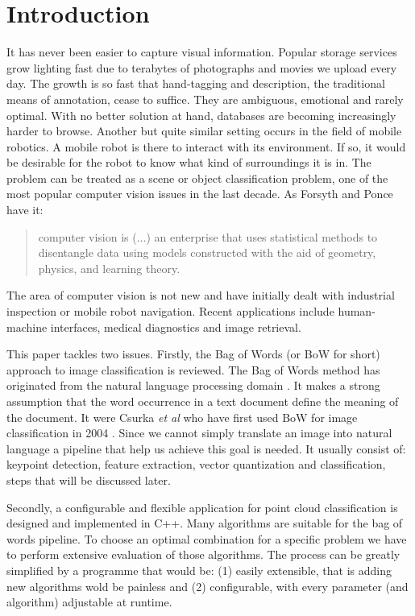 \chapter{Introduction}

	It has never been easier to capture visual information. Popular storage services grow lighting fast due to terabytes of photographs and movies we upload every day. The growth is so fast that hand-tagging and description, the traditional means of annotation, cease to suffice. They are ambiguous, emotional and rarely optimal. With no better solution at hand, databases are becoming increasingly harder to browse. Another but quite similar setting occurs in the field of mobile robotics. A mobile robot is there to interact with its environment. If so, it would be desirable for the robot to know what kind of surroundings it is in. The problem can be treated as a scene or object classification problem, one of the most popular computer vision issues in the last decade. As Forsyth and Ponce \cite{ponce2011cv} have it:
	
	\begin{quote} 
		computer vision is (...) an enterprise that uses statistical methods to disentangle data using models constructed with the aid of geometry, physics, and learning theory.
	\end{quote} 
	
	The area of computer vision is not new and have initially dealt with industrial inspection or mobile robot navigation. Recent applications include human-machine interfaces, medical diagnostics and image retrieval.
	
	This paper tackles two issues. Firstly, the Bag of Words (or BoW for short) approach to image classification is reviewed. The Bag of Words method has originated from the natural language processing domain . It makes a strong assumption that the word occurrence in a text document define the meaning of the document. It were Csurka \textit{et al} who have first used BoW for image classification in 2004 \cite{csurka2004visual}. Since we cannot simply translate an image into natural language a pipeline that help us achieve this goal is needed. It usually consist of: keypoint detection, feature extraction, vector quantization and classification, steps that will be discussed later.
	
	Secondly, a configurable and flexible application for point cloud classification is designed and implemented in C++. Many algorithms are suitable for the bag of words pipeline. To choose an optimal combination for a specific problem we have to perform extensive evaluation of those algorithms. The process can be greatly simplified by a programme that would be: (1) easily extensible, that is adding new algorithms wold be painless and (2) configurable, with every parameter (and algorithm) adjustable at runtime.
	
